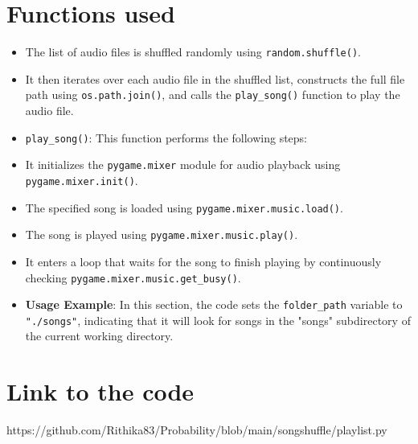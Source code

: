 \documentclass{article}
\begin{document}
\section{Functions used}   
        \begin{itemize}
           
        
                \item The list of audio files is shuffled randomly using \texttt{random.shuffle()}.
                \item It then iterates over each audio file in the shuffled list, constructs the full file path using \texttt{os.path.join()}, and calls the \texttt{play\_song()} function to play the audio file.
               
            \end{itemize}
       \begin{itemize}   
            \item \texttt{play\_song()}: This function performs the following steps:
            
                \item It initializes the \texttt{pygame.mixer} module for audio playback using \texttt{pygame.mixer.init()}.
                \item The specified song is loaded using \texttt{pygame.mixer.music.load()}.
                \item The song is played using \texttt{pygame.mixer.music.play()}.
                \item It enters a loop that waits for the song to finish playing by continuously checking \texttt{pygame.mixer.music.get\_busy()}.
            \end{itemize}
\begin{itemize}  
    \item \textbf{Usage Example}: In this section, the code sets the \texttt{folder\_path} variable to \texttt{"./songs"}, indicating that it will look for songs in the "songs" subdirectory of the current working directory.
     \end{itemize}
     
\section{Link to the code}  
     https://github.com/Rithika83/Probability/blob/main/songshuffle/playlist.py
\end{document}
